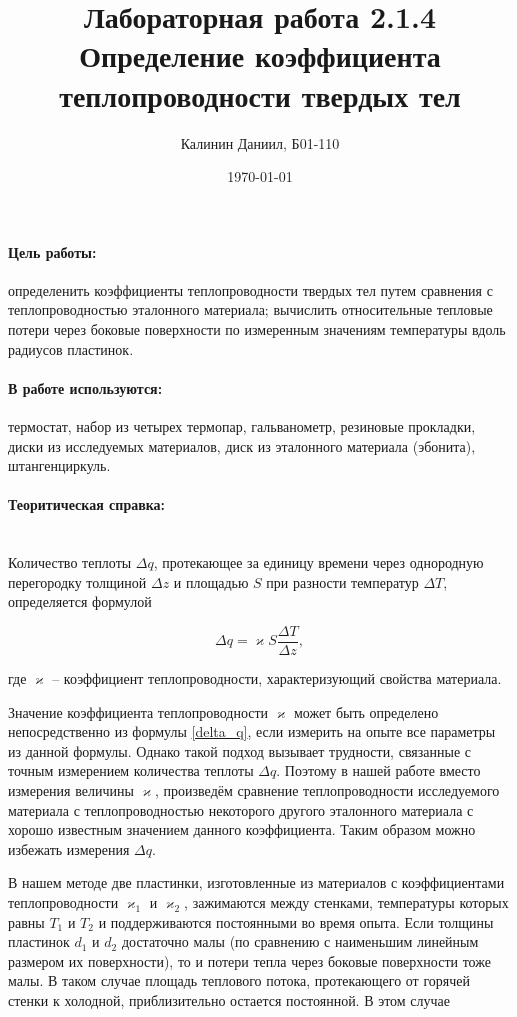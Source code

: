 \documentclass[a4paper, 12pt]{article}
\author{Калинин Даниил, Б01-110}
\date{\today}
\title{Лабораторная работа 2.1.4\\Определение коэффициента теплопроводности твердых тел}
\newcommand{\parag}[1]{\paragraph*{#1:}}
\begin{document}
\maketitle

\parag {Цель работы}
определенить коэффициенты теплопроводности твердых тел путем сравнения с теплопроводностью эталонного материала; вычислить относительные тепловые потери через боковые поверхности по измеренным значениям температуры вдоль радиусов пластинок.
	
\parag {В работе используются}
термостат, набор из четырех термопар, гальванометр, резиновые прокладки, диски из исследуемых материалов, диск из эталонного материала (эбонита), штангенциркуль.

\parag {Теоритическая справка} ~\\

Количество теплоты $\Delta q$, протекающее за единицу времени через однородную перегородку толщиной $\Delta z$ и площадью $S$ при разности температур $\Delta T$, определяется формулой

\begin{equation}
    \label{delta_q}
    \Delta q = \varkappa S \frac{\Delta T}{\Delta z},
\end{equation}

где $ \varkappa $ -- коэффициент теплопроводности, характеризующий свойства материала.

Значение коэффициента теплопроводности $\varkappa$ может быть определено непосредственно из формулы \eqref{delta_q}, если измерить на опыте все параметры из данной формулы. Однако такой подход вызывает трудности, связанные с точным измерением количества теплоты $\Delta q$. Поэтому в нашей работе вместо измерения величины $\varkappa$, произведём сравнение теплопроводности исследуемого материала с теплопроводностью некоторого другого эталонного материала с хорошо известным значением данного коэффициента. Таким образом можно избежать измерения $\Delta q$.

В нашем методе две пластинки, изготовленные из материалов с коэффициентами теплопроводности $\varkappa_{1}$ и $\varkappa_{2}$, зажимаются между стенками, температуры которых равны $T_1$ и $T_2$ и поддерживаются постоянными во время опыта. Если толщины пластинок $d_{1}$ и $d_{2}$ достаточно малы (по сравнению с наименьшим линейным размером их поверхности), то и потери тепла через боковые поверхности тоже малы. В таком случае площадь теплового потока, протекающего от горячей стенки к холодной, приблизительно остается постоянной. В этом случае
\end{document}
